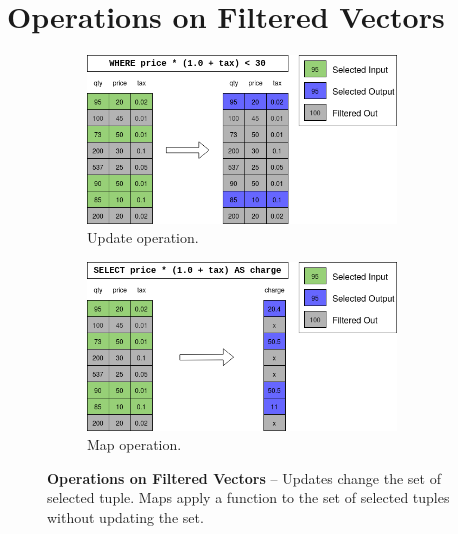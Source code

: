 \documentclass[12pt]{cmuthesis}
\begin{document}
\section{Operations on Filtered Vectors}
\begin{figure}[t!]
\centering
\begin{subfigure}{.5\textwidth}
 \centering
 \includegraphics[width=0.9\textwidth]{images/UpdateIntro.png}
 \caption{Update operation.}
  \label{fig:update_intro}
\end{subfigure}%
\begin{subfigure}{.5\textwidth}
 \centering
 \includegraphics[width=0.9\textwidth]{images/MapIntro.png}
 \caption{Map operation.}
  \label{fig:map_intro}
\end{subfigure}
\caption{\textbf{Operations on Filtered Vectors} -- Updates change the set of selected tuple. Maps apply a function to the set of selected tuples without updating the set.}
\label{fig:update_map_intro}
\end{figure}
\end{document}
